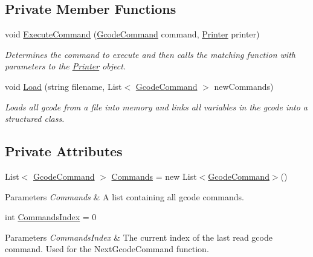 \subsection*{Private Member Functions}
\begin{DoxyCompactItemize}
\item 
void \hyperlink{class_gcode_loader_a82cfb2c8e208446db42b8d570bf9bc85}{Execute\+Command} (\hyperlink{class_gcode_command}{Gcode\+Command} command, \hyperlink{class_printer}{Printer} printer)
\begin{DoxyCompactList}\small\item\em Determines the command to execute and then calls the matching function with parameters to the \hyperlink{class_printer}{Printer} object. \end{DoxyCompactList}\item 
void \hyperlink{class_gcode_loader_a4022243922bb02571c83a4f0897bc45f}{Load} (string filename, List$<$ \hyperlink{class_gcode_command}{Gcode\+Command} $>$ new\+Commands)
\begin{DoxyCompactList}\small\item\em Loads all gcode from a file into memory and links all variables in the gcode into a structured class. \end{DoxyCompactList}\end{DoxyCompactItemize}
\subsection*{Private Attributes}
\begin{DoxyCompactItemize}
\item 
\mbox{\label{class_gcode_loader_a61536e92fe75a3387758adb23c915dd7}} 
List$<$ \hyperlink{class_gcode_command}{Gcode\+Command} $>$ \hyperlink{class_gcode_loader_a61536e92fe75a3387758adb23c915dd7}{Commands} = new List$<$\hyperlink{class_gcode_command}{Gcode\+Command}$>$()
\begin{DoxyCompactList}\small\item\em 
\begin{DoxyParams}{Parameters}
{\em Commands} & A list containing all gcode commands.\\
\hline
\end{DoxyParams}
\end{DoxyCompactList}\item 
\mbox{\label{class_gcode_loader_a4d184919835f2dfb469887d83b464c82}} 
int \hyperlink{class_gcode_loader_a4d184919835f2dfb469887d83b464c82}{Commands\+Index} = 0
\begin{DoxyCompactList}\small\item\em 
\begin{DoxyParams}{Parameters}
{\em Commands\+Index} & The current index of the last read gcode command. Used for the Next\+Gcode\+Command function.\\
\hline
\end{DoxyParams}
\end{DoxyCompactList}\end{DoxyCompactItemize}


